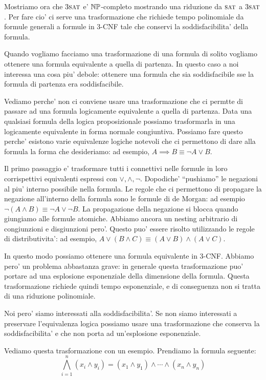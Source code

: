 Mostriamo ora che $3\textsc{sat}$ e' $\mathbb{NP}$-completo mostrando una riduzione da $\textsc{sat}$ a $3\textsc{sat}$. Per
fare cio' ci serve una trasformazione che richiede tempo polinomiale da formule generali a formule
in 3-CNF tale che conservi la soddisfacibilita' della formula.

Quando vogliamo facciamo una trasformazione di una formula di solito vogliamo ottenere una formula
equivalente a quella di partenza. In questo caso a noi interessa una cosa piu' debole: ottenere una
formula che sia soddisfacibile sse la formula di partenza era soddisfacibile.

Vediamo perche' non ci conviene usare una trasformazione che ci permtte di passare ad una formula
logicamente equivalente a quella di partenza. Data una qualsiasi formula della logica proposizionale
possiamo trasformarla in una logicamente equivalente in forma normale congiuntiva. Possiamo fare
questo perche' esistono varie equivalenze logiche notevoli che ci permettono di dare alla formula la
forma che desideriamo: ad esempio, $A \implies B \equiv \lnot A \lor B$.

Il primo passaggio e' trasformare tutti i connettivi nelle formule in loro corrispettivi equivalenti
espressi con $\lor,\land,\lnot$. Dopodiche' ``pushiamo'' le negazioni al piu' interno possibile nella
formula. Le regole che ci permettono di propagare la negazione all'interno della formula sono le
formule di de Morgan: ad esempio $\lnot (A \land B) \equiv \lnot A \lor \lnot B$. La propagazione
della negazione si blocca quando giungiamo alle formule atomiche. Abbiamo ancora un nesting
arbitrario di congiunzioni e disgiunzioni pero'. Questo puo' essere risolto utilizzando le regole di
distributivita': ad esempio, $A \lor (B \land C) \equiv (A \lor B) \land (A \lor C)$.

In questo modo possiamo ottenere una formula equivalente in 3-CNF. Abbiamo pero' un problema
abbastanza grave: in generale questa trasformazione puo' portare ad una esplosione esponenziale
della dimensione della formula. Questa trasformazione richiede quindi tempo esponenziale, e di
conseguenza non si tratta di una riduzione polinomiale.

Noi pero' siamo interessati alla soddisfacibilita'. Se non siamo interessati a preservare
l'equivalenza logica possiamo usare una trasformazione che conserva la soddisfacibilita' e che non
porta ad un'esplosione esponenziale.

Vediamo questa trasformazione con un esempio. Prendiamo la formula seguente:
\begin{equation}\label{eq:start}
    \bigwedge_{i=1}^{n}(x_{i}\land y_{i}) = (x_{1} \land y_{1}) \land \cdots \land (x_{n} \land y_{n})
\end{equation}

